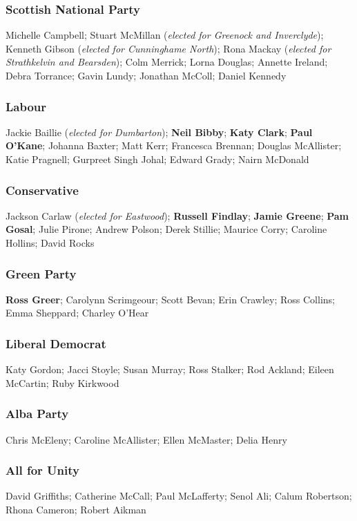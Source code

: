 \begin{resultsiii}
	\subsubsection*{Scottish National Party}
	Michelle Campbell; Stuart McMillan (\emph{elected for Greenock and Inverclyde}); Kenneth Gibson (\emph{elected for Cunninghame North}); Rona Mackay (\emph{elected for Strathkelvin and Bearsden}); Colm Merrick; Lorna Douglas; Annette Ireland; Debra Torrance; Gavin Lundy; Jonathan McColl; Daniel Kennedy
	
	\subsubsection*{Labour}
	Jackie Baillie (\emph{elected for Dumbarton}); \textbf{Neil Bibby}; \textbf{Katy Clark}; \textbf{Paul O'Kane}; Johanna Baxter; Matt Kerr; Francesca Brennan; Douglas McAllister; Katie Pragnell; Gurpreet Singh Johal; Edward Grady; Nairn McDonald
	
	\subsubsection*{Conservative}
	Jackson Carlaw (\emph{elected for Eastwood}); \textbf{Russell Findlay}; \textbf{Jamie Greene}; \textbf{Pam Gosal}; Julie Pirone; Andrew Polson; Derek Stillie; Maurice Corry; Caroline Hollins; David Rocks
	
	\subsubsection*{Green Party}
	\textbf{Ross Greer}; Carolynn Scrimgeour; Scott Bevan; Erin Crawley; Ross Collins; Emma Sheppard; Charley O'Hear
	
	\subsubsection*{Liberal Democrat}
	Katy Gordon; Jacci Stoyle; Susan Murray; Ross Stalker; Rod Ackland; Eileen McCartin; Ruby Kirkwood
	
	\subsubsection*{Alba Party}
	Chris McEleny; Caroline McAllister; Ellen McMaster; Delia Henry
	
	\subsubsection*{All for Unity}
	David Griffiths; Catherine McCall; Paul McLafferty; Senol Ali; Calum Robertson; Rhona Cameron; Robert Aikman
	

\end{resultsiii}
